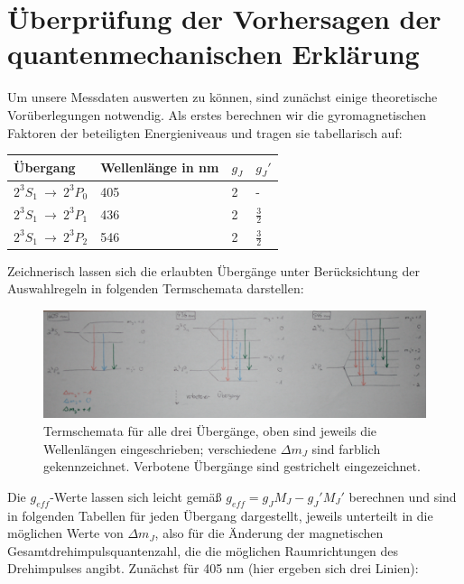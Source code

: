 \documentclass[bigchapter,colorback,accentcolor=tud4b,linedtoc,11pt]{tudreport}
\begin{document}
\section{Überprüfung der Vorhersagen der quantenmechanischen Erklärung}

Um unsere Messdaten auswerten zu können, sind zunächst einige theoretische Vorüberlegungen notwendig. Als erstes berechnen wir die gyromagnetischen Faktoren der beteiligten Energieniveaus und tragen sie tabellarisch auf: 

\begin{center}
  \begin{tabular}{|p{2.2cm}|p{4cm}|p{2cm}|p{2cm}|}
    \hline
    Übergang & Wellenlänge in nm & $g_J$ & $g_J'$  \\ \hline
    $2^3S_1~\rightarrow~2^3P_0$ & 405 & 2 & - \\ \hline
    $2^3S_1~\rightarrow~2^3P_1$ & 436 & 2 & $\frac{3}{2}$ \\ \hline
    $2^3S_1~\rightarrow~2^3P_2$ & 546 & 2 & $\frac{3}{2}$ \\ \hline
	\end{tabular}
\end{center}

Zeichnerisch lassen sich die erlaubten Übergänge unter Berücksichtung der Auswahlregeln in folgenden Termschemata darstellen:

\begin{figure}[H] 
  \centering
     \includegraphics[width=1\textwidth]{data/Termschemata.JPG}
  \caption{Termschemata für alle drei Übergänge, oben sind jeweils die Wellenlängen eingeschrieben; verschiedene $\Delta m_J$ sind farblich gekennzeichnet. Verbotene Übergänge sind gestrichelt eingezeichnet.}
  \label{fig:Bild3}
\end{figure}

Die $g_{eff}$-Werte lassen sich leicht gemäß $g_{eff} = g_J M_J - g_J' M_J'$ berechnen und sind in folgenden Tabellen für jeden Übergang dargestellt, jeweils unterteilt in die möglichen Werte von $\Delta m_J$, also für die Änderung der magnetischen Gesamtdrehimpulsquantenzahl, die die möglichen Raumrichtungen des Drehimpulses angibt. Zunächst für 405 nm (hier ergeben sich drei Linien):
\end{document}
